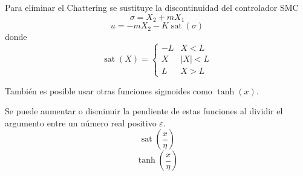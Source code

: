 \clearpage
\begin{flushright}
\end{flushright}

\subsection{\texorpdfstring{}{Pseudo modo deslizante}}

Para eliminar el Chattering se sustituye la discontinuidad del controlador SMC
\[
  \sigma=X_2+mX_1
\]
\[
  u=-mX_2-K\operatorname{sat}(\sigma)
\]
donde
\[
  \operatorname{sat}(X)=
  \begin{cases}
    -L & X<L\\
    X & \lvert X\rvert<L\\
    L & X>L
  \end{cases}
\]

También es posible usar otras funciones sigmoides como $\tanh(x)$.

Se puede aumentar o disminuir la pendiente de estas funciones al dividir el
argumento entre un número real positivo $\varepsilon$.
\[
  \operatorname{sat}\left(\frac{x}{\eta}\right)
\]
\[
  \tanh\left(\frac{x}{\eta}\right)
\]
